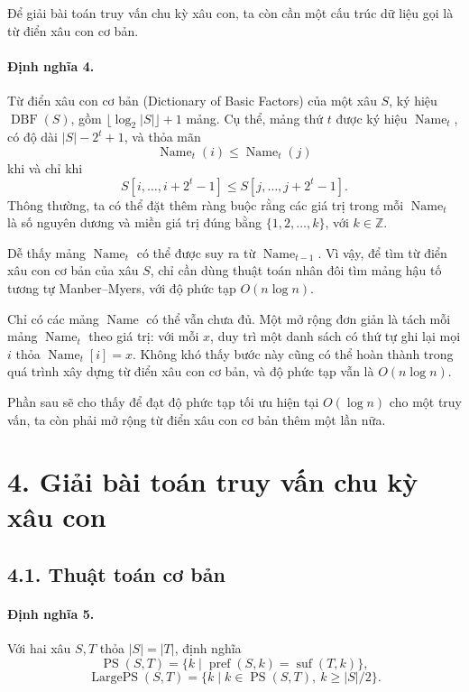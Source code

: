 \documentclass[11pt]{article}
\begin{document}
Để giải bài toán truy vấn chu kỳ xâu con, ta còn cần một cấu trúc dữ liệu gọi
là từ điển xâu con cơ bản.

\paragraph{Định nghĩa 4.}
Từ điển xâu con cơ bản (Dictionary of Basic Factors) của một xâu \(S\), ký
hiệu \(\operatorname{DBF}(S)\), gồm \(\lfloor\log_2|S|\rfloor+1\) mảng. Cụ thể,
mảng thứ \(t\) được ký hiệu \(\operatorname{Name}_t\), có độ dài
\(|S|-2^t+1\), và thỏa mãn
\[
  \operatorname{Name}_t(i)\le \operatorname{Name}_t(j)
\]
khi và chỉ khi
\[
  S[i,\ldots,i+2^t-1]\le S[j,\ldots,j+2^t-1].
\]
Thông thường, ta có thể đặt thêm ràng buộc rằng các giá trị trong mỗi
\(\operatorname{Name}_t\) là số nguyên dương và miền giá trị đúng bằng
\(\{1,2,\ldots,k\}\), với \(k\in\mathbb Z\).

Dễ thấy mảng \(\operatorname{Name}_t\) có thể được suy ra từ
\(\operatorname{Name}_{t-1}\). Vì vậy, để tìm từ điển xâu con cơ bản của xâu
\(S\), chỉ cần dùng thuật toán nhân đôi tìm mảng hậu tố tương tự Manber--Myers,
với độ phức tạp \(O(n\log n)\).

Chỉ có các mảng \(\operatorname{Name}\) có thể vẫn chưa đủ. Một mở rộng đơn
giản là tách mỗi mảng \(\operatorname{Name}_t\) theo giá trị: với mỗi \(x\),
duy trì một danh sách có thứ tự ghi lại mọi \(i\) thỏa
\(\operatorname{Name}_t[i]=x\). Không khó thấy bước này cũng có thể hoàn thành
trong quá trình xây dựng từ điển xâu con cơ bản, và độ phức tạp vẫn là
\(O(n\log n)\).

Phần sau sẽ cho thấy để đạt độ phức tạp tối ưu hiện tại \(O(\log n)\) cho một
truy vấn, ta còn phải mở rộng từ điển xâu con cơ bản thêm một lần nữa.

\section*{4. Giải bài toán truy vấn chu kỳ xâu con}

\subsection*{4.1. Thuật toán cơ bản}

\paragraph{Định nghĩa 5.}
Với hai xâu \(S,T\) thỏa \(|S|=|T|\), định nghĩa
\[
  \operatorname{PS}(S,T)=\{k\mid \operatorname{pref}(S,k)=\operatorname{suf}(T,k)\},
\]
\[
  \operatorname{LargePS}(S,T)=\{k\mid k\in\operatorname{PS}(S,T),\ k\ge |S|/2\}.
\]
\end{document}
